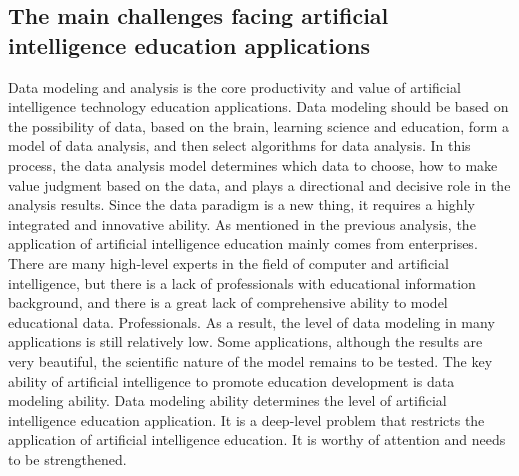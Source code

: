 \documentclass[lang=en,11pt,a4paper,towcolumn]{elegantpaper}
\begin{document}
\subsection{The main challenges facing artificial intelligence education applications}
Data modeling and analysis is the core productivity and value of artificial intelligence technology education applications. Data modeling should be based on the possibility of data, based on the brain, learning science and education, form a model of data analysis, and then select algorithms for data analysis. In this process, the data analysis model determines which data to choose, how to make value judgment based on the data, and plays a directional and decisive role in the analysis results. Since the data paradigm is a new thing, it requires a highly integrated and innovative ability. As mentioned in the previous analysis, the application of artificial intelligence education mainly comes from enterprises. There are many high-level experts in the field of computer and artificial intelligence, but there is a lack of professionals with educational information background, and there is a great lack of comprehensive ability to model educational data. Professionals. As a result, the level of data modeling in many applications is still relatively low. Some applications, although the results are very beautiful, the scientific nature of the model remains to be tested.
The key ability of artificial intelligence to promote education development is data modeling ability. Data modeling ability determines the level of artificial intelligence education application. It is a deep-level problem that restricts the application of artificial intelligence education. It is worthy of attention and needs to be strengthened.
\end{document}
